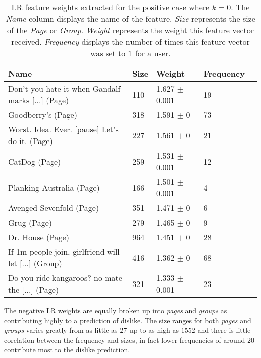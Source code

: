 \begin{table}[h]
\begin{minipage}[b]{1.0\textwidth}
\centering
  \begin{tabular}{|l|l|l|l|l|} %
  \hline
  \textbf{Name} & \textbf{Size} & \textbf{Weight} & \textbf{Frequency} \\ \hline

\small{Don't you hate it when Gandalf marks [...] (Page)} & 110 & 1.627 $\pm$ 0.001 & 19 \\ \hline
\small{Goodberry's (Page)} & 318 & 1.591 $\pm$ 0 & 73 \\ \hline
\small{Worst. Idea. Ever. [pause] Let's do it. (Page)} & 227 & 1.561 $\pm$ 0 & 21 \\ \hline
\small{CatDog (Page)} & 259 & 1.531 $\pm$ 0.001 & 12 \\ \hline
\small{Planking Australia (Page)} & 166 & 1.501 $\pm$ 0.001 & 4 \\ \hline
\small{Avenged Sevenfold (Page)} & 351 & 1.471 $\pm$ 0 & 6 \\ \hline
\small{Grug (Page)} & 279 & 1.465 $\pm$ 0 & 9 \\ \hline
\small{Dr. House (Page)} & 964 & 1.451 $\pm$ 0 & 28 \\ \hline
\small{If 1m people join, girlfriend will let [...] (Group)} & 416 & 1.362 $\pm$ 0 & 68 \\ \hline
\small{Do you ride kangaroos? no mate the [...] (Page)} & 321 & 1.333 $\pm$ 0.001 & 23 \\ \hline
  \end{tabular}
  \caption{LR feature weights extracted for the positive case where $k=0$. The \emph{Name} column displays the name of the feature.
                        \emph{Size} represents the size of the \emph{Page} or \emph{Group}.
                        \emph{Weight} represents the weight this feature vector received.  
                        \emph{Frequency} displays the number of times this feature vector was set to $1$ for a user.}
\end{minipage}
\end{table}

The negative LR weights are equally broken up into \emph{pages} and \emph{groups} as contributing highly to a prediction of dislike. The size ranges 
for both \emph{pages} and \emph{groups} varies greatly from as little as $27$ up to as high as $1552$ and there is little corelation between 
the frequency and sizes, in fact lower frequencies of around $20$ contribute most to the dislike prediction.

